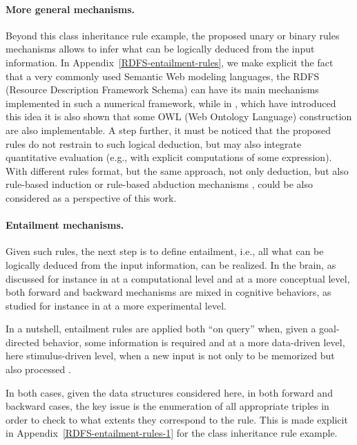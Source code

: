 \documentclass[a4]{article}
\begin{document}
\paragraph{More general mechanisms.} Beyond this class inheritance rule example, the proposed unary or binary rules mechanisms allows to infer what can be logically deduced from the input information. In Appendix~\ref{RDFS-entailment-rules}, we make explicit the fact that a very commonly used Semantic Web modeling languages, the RDFS (Resource Description Framework Schema) can have its main mechanisms implemented in such a numerical framework, while in \cite{mercier_ontology_2021}, which have introduced this idea it is also shown that some OWL (Web Ontology Language) construction are also implementable.
A step further, it must be noticed that the proposed rules do not restrain to such logical deduction, but may also integrate quantitative evaluation (e.g., with explicit computations of some expression). With different rules format, but the same approach, not only deduction, but also rule-based induction \cite{domingos_unifying_1996} or rule-based abduction mechanisms \cite{lakkaraju_rule_2000}, could be also considered as a perspective of this work. 

\paragraph{Entailment mechanisms.} Given such rules, the next step is to define entailment, i.e., all what can be logically deduced from the input information, can be realized. In the brain, as discussed for instance in \cite{oreilly_goal-driven_2014} at a computational level and \cite{friston_learning_2003} at a more conceptual level, both forward and backward mechanisms are mixed in cognitive behaviors, as studied for instance in \cite{amidu_protocol_2019} at a more experimental level.

In a nutshell, entailment rules are applied both ``on query'' when, given a goal-directed behavior, some information is required and at a more data-driven level, here stimulus-driven level, when a new input is not only to be memorized but also processed \cite{kapoor_comparative_2016}. 

In both cases, given the data structures considered here, in both forward and backward cases, the key issue is the enumeration of all appropriate triples in order to check to what extents they correspond to the rule. This is made explicit in Appendix~\ref{RDFS-entailment-rules-1} for the class inheritance rule example.
\end{document}
